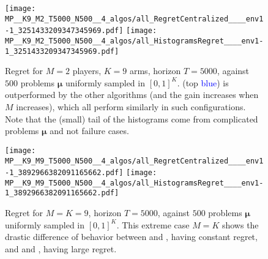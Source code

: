 %
%

\begin{figure}[!t]
  \centering
      \texttt{[image: MP\_\_K9\_M2\_T5000\_N500\_\_4\_algos/all\_RegretCentralized\_\_\_\_env1-1\_3251433209347345969.pdf]}
      \texttt{[image: MP\_\_K9\_M2\_T5000\_N500\_\_4\_algos/all\_HistogramsRegret\_\_\_\_env1-1\_3251433209347345969.pdf]}
  \caption[Regret for $M=2$ players, $K=9$ arms, horizon $T=5000$, against $500$ problems $\boldsymbol{\mu}$ uniformly sampled]{Regret for $M=2$ players, $K=9$ arms, horizon $T=5000$, against $500$ problems $\boldsymbol{\mu}$ uniformly sampled in $[0,1]^K$. \rhoRand{} (top \textcolor{blue}{blue}) is outperformed by the other algorithms (and the gain increases when $M$ increases), which all perform similarly in such configurations. Note that the (small) tail of the histograms come from complicated problems $\boldsymbol{\mu}$ and not failure cases.}
  \label{fig:5:MP__K9_M2_T5000_N500__4_algos__all_RegretCentralized__BayesianProblems}
\end{figure}


\begin{figure}[!t]
  \centering
      \texttt{[image: MP\_\_K9\_M9\_T5000\_N500\_\_4\_algos/all\_RegretCentralized\_\_\_\_env1-1\_3892966382091165662.pdf]}
      \texttt{[image: MP\_\_K9\_M9\_T5000\_N500\_\_4\_algos/all\_HistogramsRegret\_\_\_\_env1-1\_3892966382091165662.pdf]}
  \caption[Regret for $M=K=9$, horizon $T=5000$, against $500$ problems $\boldsymbol{\mu}$ uniformly sampled]{Regret for $M=K=9$, horizon $T=5000$, against $500$ problems $\boldsymbol{\mu}$ uniformly sampled in $[0,1]^K$. This extreme case $M=K$ shows the drastic difference of behavior between \RandTopM{} and \MCTopM, having constant regret, and \rhoRand{} and \Selfish, having large regret.}
  \label{fig:5:MP__K9_M9_T5000_N500__4_algos__all_HistogramsRegret}
\end{figure}


